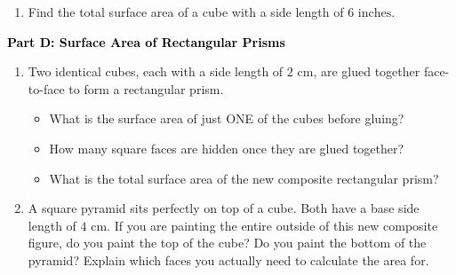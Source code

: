 \documentclass[12pt, letterpaper, fleqn]{article}
\newcommand{\blank}{\underline{\hspace{2.2cm}}}
\newcommand{\blanklong}{\underline{\hspace{6.5cm}}}
\begin{document}
\vspace{3mm}

\begin{enumerate}[itemsep=4.2cm, leftmargin=0.6cm, resume]
\begin{itemize}
\item Total Surface Area: \blanklong
\end{itemize}
\item Find the total surface area of a cube with a side length of $6\text{ inches}$.
\end{enumerate}

\newpage

\begin{tcolorbox}[colback=customteal!20]
\large\textcolor{black}{\textbf{Part D: Surface Area of Rectangular Prisms}}
\end{tcolorbox}

\vspace{3mm}

\begin{enumerate}[itemsep=4.2cm, leftmargin=0.6cm, resume]
\item Two identical cubes, each with a side length of $2\text{ cm}$, are glued together face-to-face to form a rectangular prism.
\begin{itemize}
\item What is the surface area of just ONE of the cubes before gluing? \blank
\item How many square faces are hidden once they are glued together? \blank
\item What is the total surface area of the new composite rectangular prism? \blank
\end{itemize}
\item A square pyramid sits perfectly on top of a cube. Both have a base side length of $4\text{ cm}$. If you are painting the entire outside of this new composite figure, do you paint the top of the cube? Do you paint the bottom of the pyramid? Explain which faces you actually need to calculate the area for.
\end{enumerate}
\end{document}
